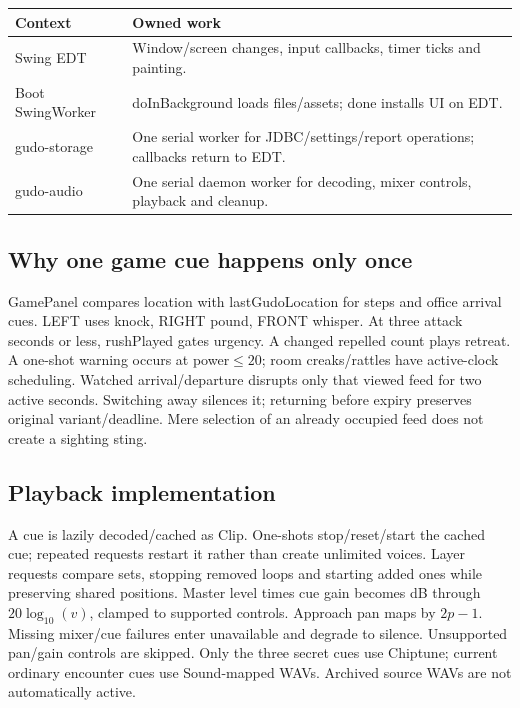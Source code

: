 \documentclass[11pt,a4paper]{article}
\begin{document}
\par\noindent\begin{tabularx}{\linewidth}{L{.23\linewidth}X}\toprule\textbf{Context}&\textbf{Owned work}\\\midrule
Swing EDT&Window/screen changes, input callbacks, timer ticks and painting.\\
Boot SwingWorker&doInBackground loads files/assets; done installs UI on EDT.\\
gudo-storage&One serial worker for JDBC/settings/report operations; callbacks return to EDT.\\
gudo-audio&One serial daemon worker for decoding, mixer controls, playback and cleanup.\\\bottomrule\end{tabularx}\par
\subsection*{Why one game cue happens only once}
GamePanel compares location with lastGudoLocation for steps and office arrival cues. LEFT uses knock, RIGHT pound, FRONT whisper. At three attack seconds or less, rushPlayed gates urgency. A changed repelled count plays retreat. A one-shot warning occurs at power$\leq20$; room creaks/rattles have active-clock scheduling.
Watched arrival/departure disrupts only that viewed feed for two active seconds. Switching away silences it; returning before expiry preserves original variant/deadline. Mere selection of an already occupied feed does not create a sighting sting.
\subsection*{Playback implementation}
A cue is lazily decoded/cached as Clip. One-shots stop/reset/start the cached cue; repeated requests restart it rather than create unlimited voices. Layer requests compare sets, stopping removed loops and starting added ones while preserving shared positions. Master level times cue gain becomes dB through $20\log_{10}(v)$, clamped to supported controls. Approach pan maps by $2p-1$.
Missing mixer/cue failures enter unavailable and degrade to silence. Unsupported pan/gain controls are skipped. Only the three secret cues use Chiptune; current ordinary encounter cues use Sound-mapped WAVs. Archived source WAVs are not automatically active.
\end{document}
